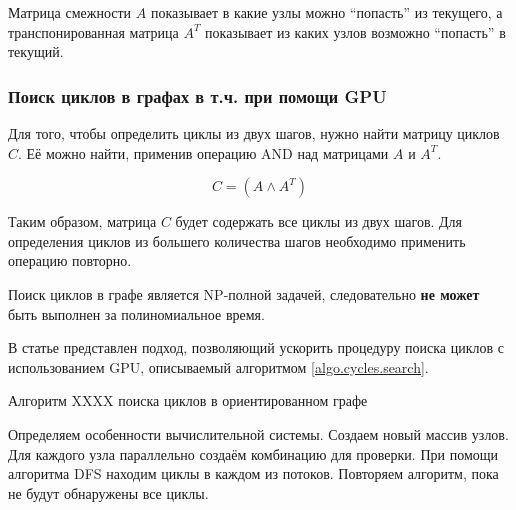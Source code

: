 Матрица смежности $A$ показывает в какие узлы можно ``попасть'' из текущего, а транспонированная матрица $A^T$ показывает из каких узлов возможно ``попасть'' в текущий.

\subsubsection{Поиск циклов в графах в т.ч. при помощи GPU}

Для того, чтобы определить циклы из двух шагов, нужно найти матрицу циклов $C$. Её можно найти, применив операцию \textsf{AND} над матрицами $A$ и $A^T$. 

\begin{equation}
    C = (A \wedge A^T)
\end{equation}

Таким образом, матрица $C$ будет содержать все циклы из двух шагов. Для определения циклов из большего количества шагов необходимо применить операцию повторно.

\begin{remark}
Поиск циклов в графе является NP-полной задачей\cite{YYY}, следовательно \textbf{не может} быть выполнен за полиномиальное время.
\end{remark}

В статье \cite{Mahdi2011} представлен подход, позволяющий ускорить процедуру поиска циклов с использованием \textsf{GPU}, описываемый алгоритмом \ref{algo.cycles.search}.

\begin{algorithm}[H]%
\caption{Алгоритм XXXX поиска циклов в ориентированном графе}\label{algo.cycles.search}
\begin{algorithmic}[1]
	\State Определяем особенности вычислительной системы.
	\State Создаем новый массив узлов.
	\State Для каждого узла параллельно создаём комбинацию для проверки.
	\State При помощи алгоритма DFS находим циклы в каждом из потоков.
	\State Повторяем алгоритм, пока не будут обнаружены все циклы.
\end{algorithmic}
\end{algorithm}

\noteattributes{}
